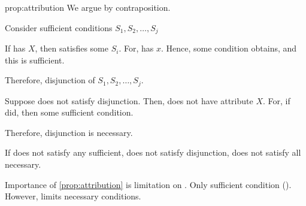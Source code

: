 \begin{note}
  \begin{argument}{prop:attribution}
    We argue by contraposition.

    Consider sufficient conditions \(S_{1}, S_{2}, \dots, S_{j}\)

    If \vAgent{} has \(X\), then \vAgent{} satisfies some \(S_{i}\).
    For, \vAgent{} has \(x\).
    Hence, some condition obtains, and this is sufficient.

    Therefore, disjunction of \(S_{1}, S_{2}, \dots, S_{j}\).

    Suppose \vAgent{} does not satisfy disjunction.
    Then, \vAgent{} does not have attribute \(X\).
    For, if did, then some sufficient condition.

    Therefore, disjunction is necessary.

    If does not satisfy any sufficient, does not satisfy disjunction, does not satisfy all necessary.
  \end{argument}
\end{note}

\begin{note}
  Importance of \autoref{prop:attribution} is limitation on \ros{}.
  Only sufficient condition (\supportI{}).
  However, \supportII{} limits necessary conditions.
\end{note}

